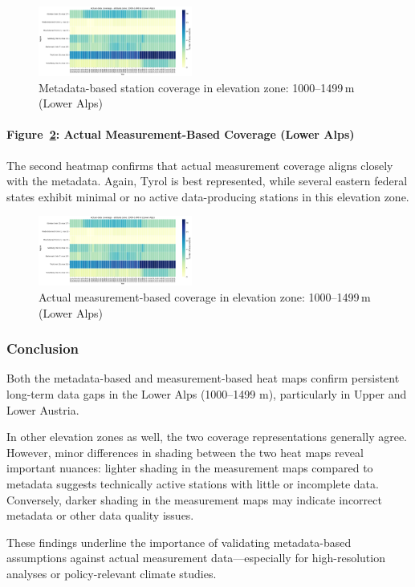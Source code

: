 \begin{figure}[ht]
  \centering
    \includegraphics[width=0.45\textwidth]{img/coverage_zone_loweralps_meta.png}
    \caption{Metadata-based station coverage in elevation zone: 1000--1499\,m (Lower Alps)}
    \label{fig:coverage_meta_loweralps}
\end{figure}

\paragraph{Figure~\ref{fig:coverage_real_loweralps}: Actual Measurement-Based Coverage (Lower Alps)}  
The second heatmap confirms that actual measurement coverage aligns closely with the metadata. Again, Tyrol is best represented, while several eastern federal states exhibit minimal or no active data-producing stations in this elevation zone.

\begin{figure}[ht]
  \centering
    \includegraphics[width=0.45\textwidth]{img/data_coverage_loweralps.png}
    \caption{Actual measurement-based coverage in elevation zone: 1000--1499\,m (Lower Alps)}
    \label{fig:coverage_real_loweralps}
\end{figure}

\subsubsection{Conclusion}
Both the metadata-based and measurement-based heat maps confirm persistent long-term data gaps in the Lower Alps (1000–1499 m), particularly in Upper and Lower Austria.

In other elevation zones as well, the two coverage representations generally agree. However, minor differences in shading between the two heat maps reveal important nuances: lighter shading in the measurement maps compared to metadata suggests technically active stations with little or incomplete data. Conversely, darker shading in the measurement maps may indicate incorrect metadata or other data quality issues.

These findings underline the importance of validating metadata-based assumptions against actual measurement data—especially for high-resolution analyses or policy-relevant climate studies.
